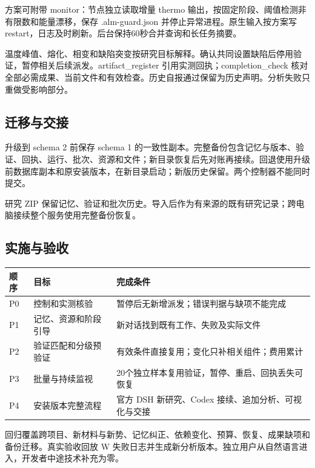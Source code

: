 \documentclass[11pt,a4paper]{ctexart}
\begin{document}
方案可附带 monitor：节点独立读取增量 thermo 输出，按固定阶段、阈值检测非有限数和能量漂移，保存 .alm-guard.json 并停止异常进程。原生输入按方案写 restart，日志及时刷新。后台保持60秒合并查询和长任务摘要。



温度峰值、熔化、相变和缺陷突变按研究目标解释。确认共同设置缺陷后停用验证，暂停相关后续派发。artifact\_\allowbreak{}register 引用实测回执；completion\_\allowbreak{}check 核对全部必需成果、当前文件和有效检查。历史自报通过保留为历史声明。分析失败只重做受影响部分。



\subsection{迁移与交接}


升级到 schema 2 前保存 schema 1 的一致性副本。完整备份包含记忆与版本、验证、回执、运行、批次、资源和文件；新目录恢复后先对账再接续。回退使用升级前数据库副本和原安装版本，在新目录启动；新版历史保留。两个控制器不能同时提交。



研究 ZIP 保留记忆、验证和批次历史。导入后作为有来源的既有研究记录；跨电脑接续整个服务使用完整备份恢复。



\subsection{实施与验收}


\begin{longtable}{p{4.67cm}p{4.67cm}p{4.67cm}}
\toprule
顺序 & 目标 & 完成条件 \\
\midrule\endhead
P0 & 控制和实测核验 & 暂停后无新增派发；错误判据与缺项不能完成 \\
P1 & 记忆、资源和阶段引导 & 新对话找到既有工作、失败及实际文件 \\
P2 & 验证匹配和分级预验证 & 有效条件直接复用；变化只补相关组件；费用累计 \\
P3 & 批量与持续监视 & 20个独立样本复用验证，暂停、重启、回执丢失可恢复 \\
P4 & 安装版本完整流程 & 官方 DSH 新研究、Codex 接续、追加分析、可视化与交接 \\
\bottomrule
\end{longtable}


回归覆盖跨项目、新材料与新势、记忆纠正、依赖变化、预算、恢复、成果缺项和备份迁移。真实验收回放 W 失败日志并生成新分析版本。独立用户从自然语言进入，开发者中途技术补充为零。
\end{document}

